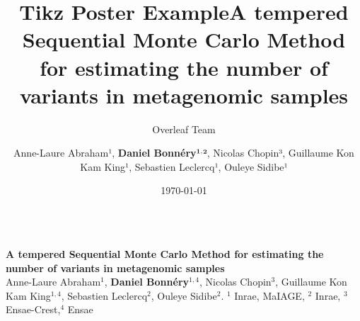 \documentclass[20pt, a0paper, portrait,colspace=5pt,blockverticalspace=5pt]{tikzposter}
\title{Tikz Poster Example}
\author{Overleaf Team}
\date{\today}
\institute{Overleaf Institute}
\title{A tempered Sequential Monte Carlo Method for estimating the number of
variants in metagenomic samples}
\author{Anne-Laure Abraham¹, {\bf Daniel Bonnéry¹$^,$²}, Nicolas Chopin³, Guillaume Kon Kam King¹, Sebastien Leclercq¹, Ouleye Sidibe¹}
\begin{document}
\makeatletter
    \setlength{\TP@blocktop}{.48\textheight}
\makeatother

\begin{columns}
\block{}
{\color{color1}
    {\Huge \bf A tempered Sequential Monte Carlo Method for estimating the number of
variants in metagenomic samples}\\

\Large
Anne-Laure Abraham$^{1}$, {\bf Daniel Bonnéry$^{1,4}$}, Nicolas Chopin$^{3}$, Guillaume Kon Kam King$^{1,4}$, Sebastien Leclercq$^{2}$, Ouleye Sidibe$^{2}$. \hspace*{1cm}\normalsize $^1$ Inrae, MaIAGE, $^2$ Inrae, $^3$ Ensae-Crest,$^4$ Ensae
}
\end{columns}
\end{document}
